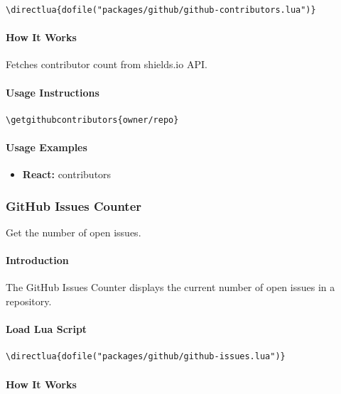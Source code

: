 \documentclass{article}
\begin{document}
\begin{verbatim}
\directlua{dofile("packages/github/github-contributors.lua")}
\end{verbatim}

\paragraph{How It Works}

Fetches contributor count from shields.io API.

\paragraph{Usage Instructions}

\begin{verbatim}
\getgithubcontributors{owner/repo}
\end{verbatim}

\paragraph{Usage Examples}

\begin{itemize}
    \item \textbf{React:}  contributors
\end{itemize}

\subsubsection{GitHub Issues Counter}

Get the number of open issues.

\paragraph{Introduction}

The GitHub Issues Counter displays the current number of open issues in a repository.

\paragraph{Load Lua Script}

\begin{verbatim}
\directlua{dofile("packages/github/github-issues.lua")}
\end{verbatim}

\paragraph{How It Works}
\end{document}
